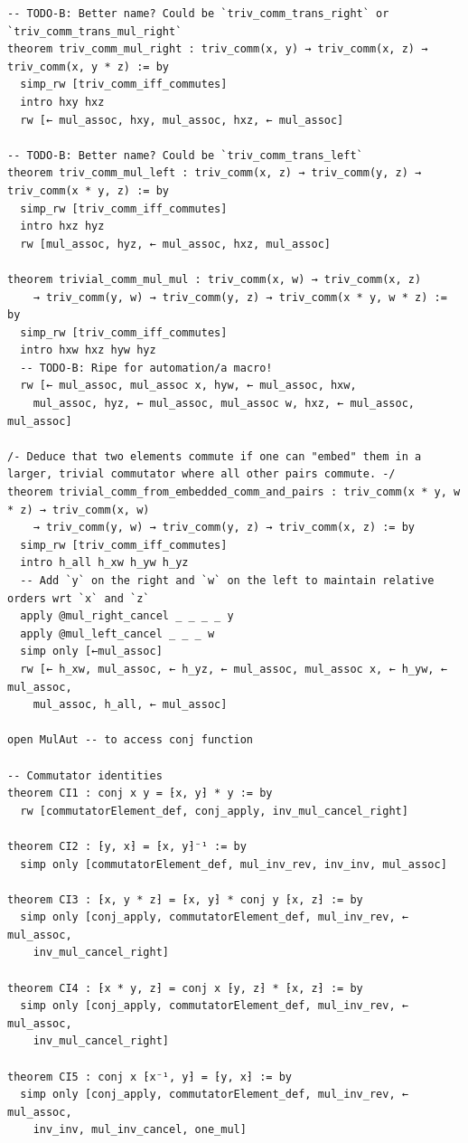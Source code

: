 \documentclass[10pt,a4paper]{article}
\begin{document}
\begin{Verbatim}
-- TODO-B: Better name? Could be `triv_comm_trans_right` or `triv_comm_trans_mul_right`
theorem triv_comm_mul_right : triv_comm(x, y) → triv_comm(x, z) → triv_comm(x, y * z) := by
  simp_rw [triv_comm_iff_commutes]
  intro hxy hxz
  rw [← mul_assoc, hxy, mul_assoc, hxz, ← mul_assoc]

-- TODO-B: Better name? Could be `triv_comm_trans_left`
theorem triv_comm_mul_left : triv_comm(x, z) → triv_comm(y, z) → triv_comm(x * y, z) := by
  simp_rw [triv_comm_iff_commutes]
  intro hxz hyz
  rw [mul_assoc, hyz, ← mul_assoc, hxz, mul_assoc]

theorem trivial_comm_mul_mul : triv_comm(x, w) → triv_comm(x, z)
    → triv_comm(y, w) → triv_comm(y, z) → triv_comm(x * y, w * z) := by
  simp_rw [triv_comm_iff_commutes]
  intro hxw hxz hyw hyz
  -- TODO-B: Ripe for automation/a macro!
  rw [← mul_assoc, mul_assoc x, hyw, ← mul_assoc, hxw,
    mul_assoc, hyz, ← mul_assoc, mul_assoc w, hxz, ← mul_assoc, mul_assoc]

/- Deduce that two elements commute if one can "embed" them in a larger, trivial commutator where all other pairs commute. -/
theorem trivial_comm_from_embedded_comm_and_pairs : triv_comm(x * y, w * z) → triv_comm(x, w)
    → triv_comm(y, w) → triv_comm(y, z) → triv_comm(x, z) := by
  simp_rw [triv_comm_iff_commutes]
  intro h_all h_xw h_yw h_yz
  -- Add `y` on the right and `w` on the left to maintain relative orders wrt `x` and `z`
  apply @mul_right_cancel _ _ _ _ y
  apply @mul_left_cancel _ _ _ w
  simp only [←mul_assoc]
  rw [← h_xw, mul_assoc, ← h_yz, ← mul_assoc, mul_assoc x, ← h_yw, ← mul_assoc,
    mul_assoc, h_all, ← mul_assoc]

open MulAut -- to access conj function

-- Commutator identities
theorem CI1 : conj x y = ⁅x, y⁆ * y := by
  rw [commutatorElement_def, conj_apply, inv_mul_cancel_right]

theorem CI2 : ⁅y, x⁆ = ⁅x, y⁆⁻¹ := by
  simp only [commutatorElement_def, mul_inv_rev, inv_inv, mul_assoc]

theorem CI3 : ⁅x, y * z⁆ = ⁅x, y⁆ * conj y ⁅x, z⁆ := by
  simp only [conj_apply, commutatorElement_def, mul_inv_rev, ← mul_assoc,
    inv_mul_cancel_right]

theorem CI4 : ⁅x * y, z⁆ = conj x ⁅y, z⁆ * ⁅x, z⁆ := by
  simp only [conj_apply, commutatorElement_def, mul_inv_rev, ← mul_assoc,
    inv_mul_cancel_right]

theorem CI5 : conj x ⁅x⁻¹, y⁆ = ⁅y, x⁆ := by
  simp only [conj_apply, commutatorElement_def, mul_inv_rev, ← mul_assoc,
    inv_inv, mul_inv_cancel, one_mul]


\end{Verbatim}
\end{document}
